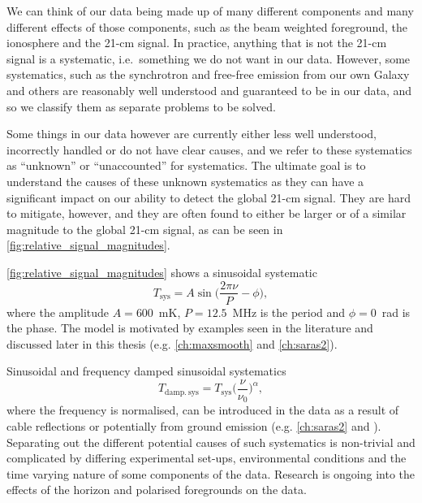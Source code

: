 We can think of our data being made up of many different components and many different effects of those components, such as the beam weighted foreground, the ionosphere and the 21-cm signal. In practice, anything that is not the 21-cm signal is a systematic, i.e.~something we do not want in our data. However, some systematics, such as the synchrotron and free-free emission from our own Galaxy and others are reasonably well understood and guaranteed to be in our data, and so we classify them as separate problems to be solved.

Some things in our data however are currently either less well understood, incorrectly handled or do not have clear causes, and we refer to these systematics as ``unknown'' or ``unaccounted'' for systematics. The ultimate goal is to understand the causes of these unknown systematics as they can have a significant impact on our ability to detect the global 21-cm signal. They are hard to mitigate, however, and they are often found to either be larger or of a similar magnitude to the global 21-cm signal, as can be seen in \cref{fig:relative_signal_magnitudes}.

\cref{fig:relative_signal_magnitudes} shows a sinusoidal systematic
\begin{equation}
    T_\mathrm{sys} = A \sin\bigg(\frac{2\pi \nu}{P} - \phi\bigg),
\end{equation}
where the amplitude $A = 600$~mK, $P=12.5$~MHz is the period and $\phi=0$~rad is the phase. The model is motivated by examples seen in the literature and discussed later in this thesis (e.g. \cref{ch:maxsmooth} and \cref{ch:saras2}).

Sinusoidal and frequency damped sinusoidal systematics
\begin{equation}
    T_\mathrm{damp.~sys} = T_\mathrm{sys} \bigg( \frac{\nu}{\nu_0}\bigg)^{\alpha},
\end{equation}
where the frequency is normalised, can be introduced in the data as a result of cable reflections \cite{Scheutwinkel2022b} or potentially from ground emission (e.g. \cref{ch:saras2} and \cite{Spinelli_soil_leda_2022}). Separating out the different potential causes of such systematics is non-trivial and complicated by differing experimental set-ups, environmental conditions and the time varying nature of some components of the data. Research is ongoing into the effects of the horizon \cite{Bassett_horizon_2021} and polarised foregrounds \cite{Spinelli_polarization_2018, Spinelli_polarization_2019} on the data.

